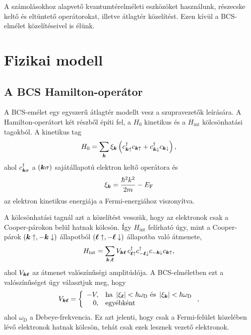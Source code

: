 \documentclass[a4paper,12pt,titlepage]{article}
\newcommand{\KK}{{\vb*{k}}}
\newcommand{\LL}{{\vb*{\ell}}}
\begin{document}
A számolásokhoz alapvető kvantumtérelméleti eszközöket használunk, részecske keltő és eltüntető operátorokat, illetve átlagtér közelítést.  Ezen kívül a BCS-elmélet közelítéseivel is élünk.



\section{Fizikai modell}

\subsection{A BCS Hamilton-operátor}

A BCS-emélet egy egyszerű átlagtér modellt vesz a szupravezetők leírására.  A Hamilton-operátort két részből építi fel, a $H_0$ kinetikus és a $H_\text{int}$ kölcsönhatási tagokból.  A kinetikus tag
\begin{equation}
	H_0 = \sum\limits_\KK \xi_\KK \left( c_{\KK \uparrow}^\dagger c_{\KK \uparrow} + c_{\KK \downarrow}^\dagger c_{\KK \downarrow} \right),
\end{equation}
ahol $c_{\KK \sigma}^\dagger$ a $\left( \KK \sigma \right)$ sajátállapotú elektron keltő operátora és
$$ \xi_\KK = \frac{\hbar^2 k^2}{2 m} - E_\text{F} $$
az elektron kinetikus energiája a Fermi-energiához viszonyítva.

A kölcsönhatási tagnál azt a közelítést vesszük, hogy az elektronok csak a Cooper-párokon belül hatnak kölcsön.  Így $H_\text{int}$ felírható úgy, mint a Cooper-párok $\left( \KK \uparrow, -\KK \downarrow \right)$ állapotból $\left( \LL \uparrow, -\LL \downarrow \right)$ állapotba való átmenete,
\begin{equation} \label{H-int-def}
	H_\text{int} = \sum\limits_{\KK, \LL} V_{\KK \LL} \, c_{\LL \uparrow}^\dagger c_{-\LL \downarrow}^\dagger c_{-\KK \downarrow} c_{\KK \uparrow},
\end{equation}
ahol $V_{\KK \LL}$ az átmenet valószínűségi amplitúdója.  A BCS-elméletben ezt a valószínűséget úgy választjuk meg, hogy
$$ V_{\KK \LL} = \left\{ \begin{array}{rl}
	-V, & \text{ha } \left| \xi_\LL \right| < \hbar \omega_\text{D} \text{ és } \left| \xi_\KK \right| < \hbar \omega_\text{D} \\
	0, & \text{egyébként}
\end{array} \right. , $$
ahol $\omega_\text{D}$ a Debeye-frekvencia.  Ez azt jelenti, hogy csak a Fermi-felület közelében lévő elektronok hatnak kölcsön, tehát csak ezek lesznek vezető elektronok.
\end{document}
